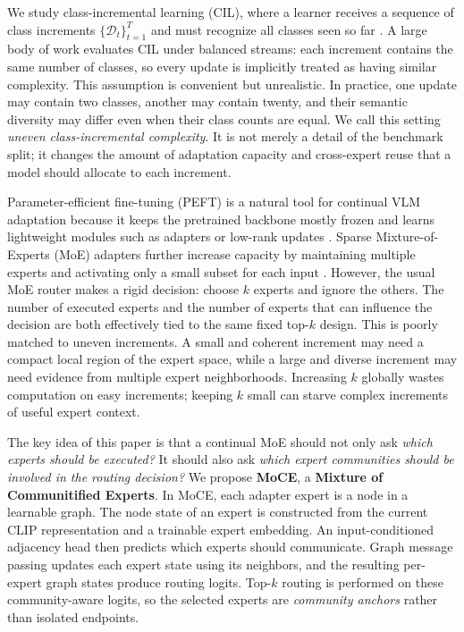 \documentclass{article}
\theoremstyle{definition}
\theoremstyle{remark}
\begin{document}
We study class-incremental learning (CIL), where a learner receives a sequence of class increments $\{\mathcal{D}_t\}_{t=1}^{T}$ and must recognize all classes seen so far \cite{Zhou_2024}. A large body of work evaluates CIL under balanced streams: each increment contains the same number of classes, so every update is implicitly treated as having similar complexity. This assumption is convenient but unrealistic. In practice, one update may contain two classes, another may contain twenty, and their semantic diversity may differ even when their class counts are equal. We call this setting \emph{uneven class-incremental complexity}. It is not merely a detail of the benchmark split; it changes the amount of adaptation capacity and cross-expert reuse that a model should allocate to each increment.

Parameter-efficient fine-tuning (PEFT) is a natural tool for continual VLM adaptation because it keeps the pretrained backbone mostly frozen and learns lightweight modules such as adapters or low-rank updates \cite{houlsby2019parameter,hu2022lora,tang2024mindinterferenceretainingpretrained}. Sparse Mixture-of-Experts (MoE) adapters further increase capacity by maintaining multiple experts and activating only a small subset for each input \cite{shazeer2017outrageously,fedus2022switch,yu2024boostingcontinuallearningvisionlanguage,11122658}. However, the usual MoE router makes a rigid decision: choose $k$ experts and ignore the others. The number of executed experts and the number of experts that can influence the decision are both effectively tied to the same fixed top-$k$ design. This is poorly matched to uneven increments. A small and coherent increment may need a compact local region of the expert space, while a large and diverse increment may need evidence from multiple expert neighborhoods. Increasing $k$ globally wastes computation on easy increments; keeping $k$ small can starve complex increments of useful expert context.

The key idea of this paper is that a continual MoE should not only ask \emph{which experts should be executed?} It should also ask \emph{which expert communities should be involved in the routing decision?} We propose \textbf{MoCE}, a \textbf{Mixture of Communitified Experts}. In MoCE, each adapter expert is a node in a learnable graph. The node state of an expert is constructed from the current CLIP representation and a trainable expert embedding. An input-conditioned adjacency head then predicts which experts should communicate. Graph message passing updates each expert state using its neighbors, and the resulting per-expert graph states produce routing logits. Top-$k$ routing is performed on these community-aware logits, so the selected experts are \emph{community anchors} rather than isolated endpoints.
\end{document}
